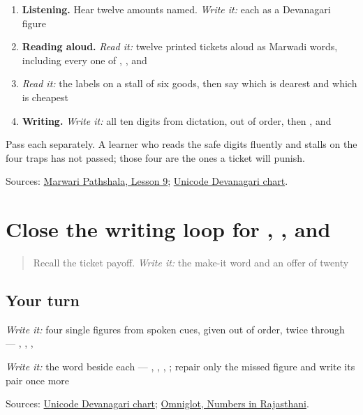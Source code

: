 \begin{enumerate}
\raggedright
  \item \textbf{Listening.} Hear twelve amounts named. \emph{Write it:} each as a Devanagari figure
  \item \textbf{Reading aloud.} \emph{Read it:} twelve printed tickets aloud as Marwadi words, including every one of \textbf{}, \textbf{}, \textbf{} and \textbf{}
  \item \emph{Read it:} the labels on a stall of six goods, then say which is dearest and which is cheapest
  \item \textbf{Writing.} \emph{Write it:} all ten digits from dictation, out of order, then \textbf{}, \textbf{} and \textbf{}
\end{enumerate}

Pass each separately. A learner who reads the safe digits fluently and stalls on the four traps has not passed; those four are the ones a ticket will punish.

\begin{tcolorbox}[breakable,colback=teal!4,colframe=teal!35!black,title={Before you move on}]
Sources: \href{https://www.marwaripathshala.com/marwari-lesson-9-english}{Marwari Pathshala, Lesson 9}; \href{https://www.unicode.org/charts/PDF/U0900.pdf}{Unicode Devanagari chart}.
\end{tcolorbox}
\section[Practice]{Close the writing loop for , ,  and }

\label{lesson:MW-R35-script-close}



\begin{quote}
Recall the ticket payoff. \emph{Write it:} the make-it word and an offer of twenty
\end{quote}

\subsection*{Your turn}
\emph{Write it:} four single figures from spoken cues, given out of order, twice through — \textbf{}, \textbf{}, \textbf{}, \textbf{}

\emph{Write it:} the word beside each — \textbf{}, \textbf{}, \textbf{}, \textbf{}; repair only the missed figure and write its pair once more

\begin{tcolorbox}[breakable,colback=teal!4,colframe=teal!35!black,title={Before you move on}]
Sources: \href{https://www.unicode.org/charts/PDF/U0900.pdf}{Unicode Devanagari chart}; \href{https://www.omniglot.com/language/numbers/rajasthani.htm}{Omniglot, Numbers in Rajasthani}.
\end{tcolorbox}
